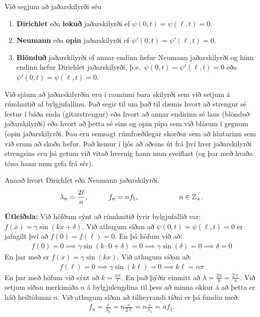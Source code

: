 \begin{tcolorbox}
\begin{definition}
Við segjum að jaðarskilyrði séu
\begin{enumerate}[label = \textbf{(\roman*)}]
    \item \textbf{Dirichlet} eða \textbf{lokuð} jaðarskilyrði ef $\psi(0,t) = \psi(\ell,t) = 0$.
    \item \textbf{Neumann} eða \textbf{opin} jaðarskilyrði ef $\psi'(0,t) = \psi'(\ell,t) = 0$.
    \item \textbf{Blönduð} jaðarskilyrði ef annar endinn hefur Neumann jaðarskilyrði og hinn endinn hefur Dirichlet jaðarskilyrði, þ.e.~$\psi(0,t) = \psi'(\ell,t) = 0$ eða $\psi'(0,t) = \psi(\ell,t) = 0$. 
\end{enumerate}
\end{definition}
\end{tcolorbox}

Við sjáum að jaðarskilyrðin eru í rauninni bara skilyrði sem við setjum á rúmhnitið af bylgjufallinu. Það segir til um það til dæmis hvort að strengur sé festur í báða enda (gítarstrengur) eða hvort að annar endirinn sé laus (blönduð jaðarskilyrði) eða hvort að þetta sé eins og opin pípa sem við blásum í gegnum (opin jaðarskilyrði. Þau eru semsagt rúmfræðilegar skorður sem að hluturinn sem við erum að skoða hefur. Það kemur í ljós að aðeins út frá því hver jaðarskilyrði strengsins eru þá getum við vitað hvernig hann mun sveiflast (og þar með hvaða tóna hann mun gefa frá sér).


\begin{tcolorbox}
\begin{theorem}
Annað hvort Dirichlet eða Neumann jaðarskilyrði.
\begin{align*}
    \lambda_n = \frac{2\ell}{n}, \hspace{1cm} f_n = nf_1, \hspace{2cm} n \in \mathbb{Z}_+.
\end{align*}
\end{theorem}
\end{tcolorbox}

\textbf{Útleiðsla:} Við höfðum sýnt að rúmhnitið fyrir bylgjufallið var: $f(x) = \gamma \sin(kx + \delta)$. Við athugum síðan að $\psi(0,t) = \psi(\ell,t) = 0$ er jafngilt því að $f(0) = f(\ell) = 0$. En þá höfum við að:
\begin{align*}
    f(0) = 0 \implies \gamma \sin(k\cdot 0 + \delta ) = 0 \implies \gamma \sin(\delta) = 0 \implies \delta = 0
\end{align*}
En þar með er $f(x) = \gamma \sin(kx)$. Við athugum síðan að:
\begin{align*}
    f(\ell) = 0 \implies \gamma \sin(k\ell) = 0 \implies k\ell = n\pi
\end{align*}
En þar með höfum við sýnt að $k = \frac{n\pi}{\ell}$. En það þýðir einmitt að $\lambda = \frac{2\pi}{k} = \frac{2\ell}{n}$. Við setjum síðan merkimiða $n$ á bylgjulengdina til þess að minna okkur á að þetta er háð heiltölunni $n$. Við athugum síðan að tilheyrandi tíðni er þá fundin með:
\begin{align*}
    f_n = \frac{c}{\lambda_n} = n \frac{c}{2\ell} = n \frac{c}{\lambda_1} = nf_1.
\end{align*}

